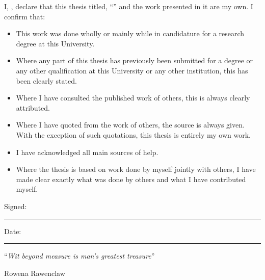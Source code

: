 \documentclass[
12pt, %
oneside, %
english, %
doublespacing, %
headsepline, %
chapterinoneline, %
]{MastersDoctoralThesis} %
\begin{document}

\begin{declaration}
\addchaptertocentry{\authorshipname} %
\noindent I, \authorname, declare that this thesis titled, \enquote{\ttitle} and the work presented in it are my own. I confirm that:

\begin{itemize} 
\item This work was done wholly or mainly while in candidature for a research degree at this University.
\item Where any part of this thesis has previously been submitted for a degree or any other qualification at this University or any other institution, this has been clearly stated.
\item Where I have consulted the published work of others, this is always clearly attributed.
\item Where I have quoted from the work of others, the source is always given. With the exception of such quotations, this thesis is entirely my own work.
\item I have acknowledged all main sources of help.
\item Where the thesis is based on work done by myself jointly with others, I have made clear exactly what was done by others and what I have contributed myself.\\
\end{itemize}  
\noindent Signed:\\
\rule[0.5em]{25em}{0.5pt} %
\noindent Date:\\
\rule[0.5em]{25em}{0.5pt} %
\end{declaration}

\cleardoublepage


\vspace*{0.2\textheight}

\noindent\enquote{\itshape Wit beyond measure is man's greatest treasure}\bigbreak

\hfill Rowena Rawenclaw
\end{document}
